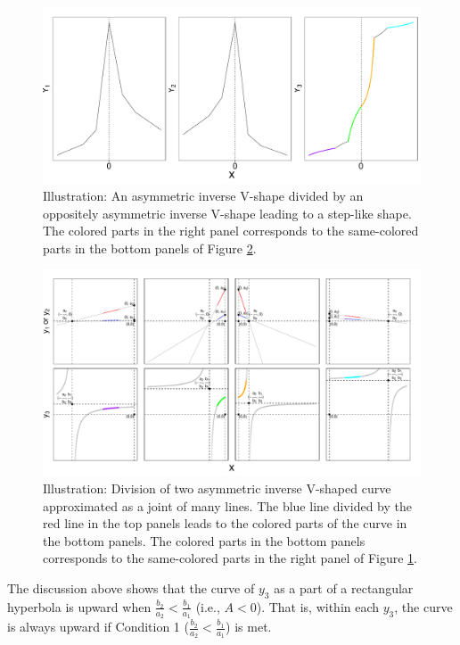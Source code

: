 \documentclass[11pt, a4paper]{article}
\begin{document}
\begin{figure}[H]
	\centering
	\includegraphics[width=0.9\columnwidth]{illustration_color.pdf}
	\caption{\small Illustration: An asymmetric inverse V-shape divided by an oppositely asymmetric inverse V-shape leading to a step-like shape. The colored parts in the right panel corresponds to the same-colored parts in the bottom panels of Figure \ref{figure:illustration_hyperbola}.}
	\label{figure:illustration_color}
\end{figure}


\begin{figure}[H]
	\centering
	\hspace*{-2cm} 
	\includegraphics[width=1.4\columnwidth]{illustration_together.pdf}
	\caption{\small Illustration: Division of two asymmetric inverse V-shaped curve approximated as a joint of many lines. The blue line divided by the red line in the top panels leads to the colored parts of the curve in the bottom panels. The colored parts in the bottom panels corresponds to the same-colored parts in the right panel of Figure \ref{figure:illustration_color}.}
	\label{figure:illustration_hyperbola}
\end{figure}

\noindent
The discussion above shows that the curve of $y_3$ as a part of a rectangular hyperbola is upward when $\frac{b_2}{a_2}<\frac{b_1}{a_1}$ (i.e., $A<0$). That is, within each $y_3$, the curve is always upward if Condition 1 ($\frac{b_2}{a_2}<\frac{b_1}{a_1}$) is met.
\end{document}
